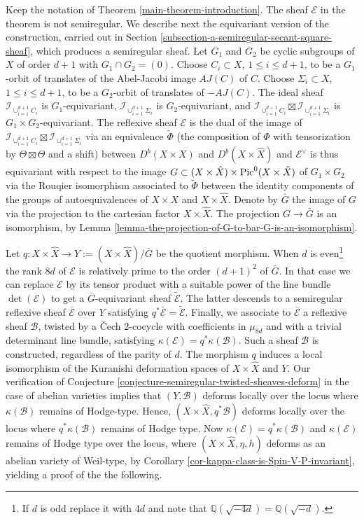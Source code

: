 \documentclass[12pt]{amsart}
\numberwithin{equation}{subsection}
\theoremstyle{plain}
\theoremstyle{definition}
\newcommand{\B}{{\mathcal B}}
\newcommand{\E}{{\mathcal E}}
\newcommand{\QQ}{{\mathbb Q}}
\newcommand{\Pic}{{\rm Pic}}
\newcommand{\Ideal}[1]{{\mathcal I}_{#1}}
\begin{document}
Keep the notation of Theorem \ref{main-theorem-introduction}. The sheaf $\E$ in the theorem is not semiregular. We describe next the equivariant version of the construction, carried out in Section \ref{subsection-a-semiregular-secant-square-sheaf}, which produces a semiregular sheaf.
Let $G_1$ and $G_2$ be cyclic subgroups of $X$ of order $d+1$ with $G_1\cap G_2=(0)$. Choose $C_i\subset X$, $1\leq i \leq d+1$, to be a $G_1$-orbit of translates of the Abel-Jacobi image $AJ(C)$ of $C$. Choose $\Sigma_i\subset X$, $1\leq i \leq d+1$, to be a $G_2$-orbit of translates of  $-AJ(C)$. 
The ideal sheaf $\Ideal{\cup_{i=1}^{d+1} C_i}$ is $G_1$-equivariant, $\Ideal{\cup_{i=1}^{d+1} \Sigma_i}$ is $G_2$-equivariant,
and $\Ideal{\cup_{i=1}^{d+1} C_i}\boxtimes \Ideal{\cup_{i=1}^{d+1} \Sigma_i}$ is $G_1\times G_2$-equivariant. The reflexive sheaf $\E$ is the dual of the image of $\Ideal{\cup_{i=1}^{d+1} C_i}\boxtimes \Ideal{\cup_{i=1}^{d+1} \Sigma_i}$ via an equivalence $\tilde{\Phi}$ (the composition of $\Phi$ with tensorization by $\Theta\boxtimes\Theta$ and a shift) between $D^b(X\times X)$ and $D^b(X\times\hat{X})$
and $\E^\vee$ is thus equivariant with respect to the image $G\subset (X\times \hat{X})\times \Pic^0(X\times \hat{X})$ of $G_1\times G_2$ via the Rouqier isomorphism  associated to $\tilde{\Phi}$ between the identity components of the groups of autoequivalences of $X\times X$ and $X\times\hat{X}$. Denote by $\bar{G}$ the image of $G$ via the projection to the cartesian factor  $X\times\hat{X}$. 
The projection $G\rightarrow\bar{G}$ is an isomorphism, by Lemma \ref{lemma-the-projection-of-G-to-bar-G-is-an-isomorphism}.

Let $q:X\times\hat{X}\rightarrow Y:=(X\times\hat{X})/\bar{G}$ be the quotient morphism.  
When $d$ is even\footnote{If $d$ is odd replace it with $4d$ and note that $\QQ(\sqrt{-4d})=\QQ(\sqrt{-d})$.} the rank $8d$ of $\E$ is relatively prime to the order $(d+1)^2$ of $\bar{G}$. In that case 
we can replace $\E$ by its tensor product with a suitable power of the line bundle $\det(\E)$ to get a $\bar{G}$-equivariant sheaf $\tilde{\E}$. The latter descends to a semiregular reflexive sheaf $\bar{\E}$ over $Y$ satisfying $q^*\bar{\E}=\tilde{\E}$. Finally, we associate to $\bar{\E}$ a reflexive sheaf $\B$, twisted by a \v{C}ech $2$-cocycle with coefficients in $\mu_{8d}$ and with a trivial determinant line bundle, satisfying 
$\kappa(\E)=q^*\kappa(\B)$.
Such a sheaf $\B$ is constructed, regardless of the parity of $d$.
The morphism $q$ induces a local isomorphism of the Kuranishi deformation spaces of $X\times\hat{X}$ and $Y$. 
Our verification of Conjecture  \ref{conjecture-semiregular-twisted-sheaves-deform} in the case of abelian varieties 
implies that $(Y,\B)$ deforms locally over the locus where $\kappa(\B)$ remains of Hodge-type. Hence, $(X\times \hat{X},q^*\B)$ deforms locally over the locus where $q^*\kappa(\B)$ remains of Hodge type.  Now $\kappa(\E)=q^*\kappa(\B)$ and $\kappa(\E)$ remains of Hodge type over the locus, where $(X\times\hat{X},\eta,h)$ deforms as an abelian variety of Weil-type, by Corollary \ref{cor-kappa-class-is-Spin-V-P-invariant}, yielding a proof of the the following.
\end{document}
